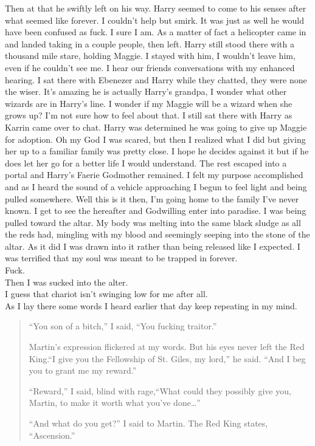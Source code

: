 Then at that he swiftly left on his way. Harry seemed to come to his senses after what seemed like forever. I couldn't help but smirk. It was just as well he would have been confused as fuck. I sure I am.  As a matter of fact a helicopter came in and landed taking in a couple people, then left. Harry still stood there with a thousand mile stare, holding Maggie. I stayed with him, I wouldn't leave him, even if he couldn't see me. I hear our friends conversations with my enhanced hearing. I sat there with Ebenezer and Harry while they chatted, they were none the wiser. It's amazing he is actually Harry's grandpa, I wonder what other wizards are in Harry's line. I wonder if my Maggie will be a wizard when she grows up? I'm not sure how to feel about that. I still sat there with Harry as Karrin came over to chat. Harry was determined he was going to give up Maggie for adoption. Oh my God I was scared, but then I realized what I did but giving her up to a familiar family was pretty close. I hope he decides against it but if he does let her go for a better life I would understand. The rest escaped into a portal and Harry's Faerie Godmother remained. I felt my purpose accomplished and as I heard the sound of a vehicle approaching I begun to feel light and being pulled somewhere. Well this is it then, I'm going home to the family I've never known. I get to see the hereafter and Godwilling enter into paradise. I was being pulled toward the altar. My body was melting into the same black sludge as all the reds had, mingling with my blood and seemingly seeping into the stone of the altar. As it did I was drawn into it rather than being released like I expected. I was terrified that my soul was meant to be trapped in \chichenitza* forever.\\

Fuck.\\

Then I was sucked into the alter.\\

I guess that chariot isn't swinging low for me after all.\\

As I lay there some words I heard earlier that day keep repeating in my mind.
\begin{quotation}
	``You son of a bitch,'' I said, ``You fucking traitor.''
	
	Martin’s expression flickered at my words. But his eyes never left the Red King.``I give you the Fellowship of St. Giles, my lord,'' he said. ``And I beg you to grant me my reward.''
	
	``Reward,'' I said, blind with rage,``What could they possibly give you, Martin, to make it worth what you’ve done\dots''

	``And what do you get?'' I said to Martin.
	The Red King states, ``Ascension.''
\end{quotation}

